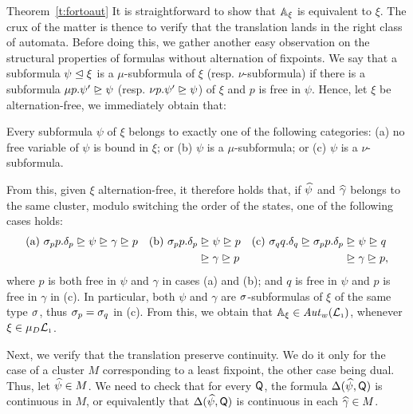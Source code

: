 \begin{proofof}{Theorem~\ref{t:fortoaut}}
It is straightforward to show that $\mathbb{A}_\xi$ is equivalent to $\xi$. The crux of the matter is thence to verify that the translation lands in the right class of automata.
Before doing this, we gather another easy observation on the structural properties of formulas without alternation of fixpoints. 
We say that a subformula 
$\psi  \trianglelefteq \xi$  is a $\mu$-subformula of $\xi$ (resp. $\nu$-subformula) if there is a subformula $\mu p. \psi' \trianglerighteq \psi$ (resp. $\nu p. \psi' \trianglerighteq \psi$) of $\xi$ and $p$ is free in $\psi$. 
Hence, let $\xi$ be alternation-free, we immediately obtain that:

\begin{claim}
Every subformula $\psi$ of $\xi$ belongs to exactly one of the following categories: (a) no free variable of $\psi$ is bound in $\xi$; or (b) $\psi$ is a $\mu$-subformula; or (c) $\psi$ is a $\nu$-subformula.
\end{claim}

From this, given $\xi$ alternation-free, it  therefore holds that, if $\widehat{\psi}$ and $\widehat{\gamma}$ belongs to the same cluster, modulo switching the order of the states, one of the following cases holds:
		\begin{align*}
			\text{(a) } \somefp_p p.\delta_p & \supf \psi \supf \gamma \supf p &
			\text{(b) } \somefp_p p.\delta_p & \supf \psi \supf p &
			\text{(c) } \somefp_q q.\delta_q \supf \somefp_p p.\delta_p & \supf \psi \supf q \\
								   &&& \supf \gamma \supf p
								   && \supf \gamma \supf p,
		\end{align*}
		where $p$ is both free in $\psi$ and $\gamma$  in cases (a) and (b); and $q$ is free in $\psi$ and $p$ is free in $\gamma$ in (c). In particular, both $\psi$ and $\gamma$ are $\sigma$-subformulas of $\xi$ of the same type $\sigma$, thus $\sigma_p=\sigma_q$ in (c). From this, we obtain that $\mathbb{A}_\xi \in \mathit{Aut}_{w}(\mathcal{L}_{\scriptscriptstyle 1})$, whenever $\xi  \in \mu_{D}\mathcal{L}_{\scriptscriptstyle 1}$.

Next, we verify that the translation preserve continuity. We do it only for the case of a cluster $M$ corresponding to a least fixpoint, the other case being dual. Thus, let $\widehat{\psi} \in M$. We need to check that for every  $\mathsf{Q}$, the formula $\Delta(\widehat{\psi}, \mathsf{Q})$ is continuous in $M$, or equivalently that $\Delta(\widehat{\psi}, \mathsf{Q})$ is continuous in each $\widehat{\gamma} \in M$. 


\end{proofof}
